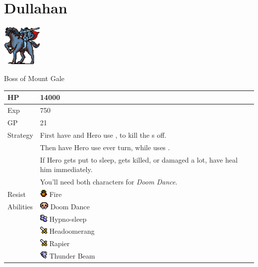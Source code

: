 \section{Dullahan}
\label{monster:dullahan}

\includegraphics[height=2cm,keepaspectratio]{./resources/monster/dullahan}

Boss of Mount Gale

\begin{longtable}{ l p{9cm} }
	HP
	& 14000
\\ \hline
	Exp
	& 750
\\ \hline
	GP
	& 21
\\ \hline
	Strategy
	& First have \nameref{char:kaeli} and Hero use \nameref{spell:aero}, to kill the \nameref{monster:vampire}s off. \\
	& Then have Hero use \nameref{spell:meteor} ever turn, while \nameref{char:kaeli} uses \nameref{spell:aero}. \\
	& If Hero gets put to sleep, gets killed, or damaged a lot, have \nameref{char:kaeli} heal him immediately. \\
	& You'll need both characters for \textit{Doom Dance}.
\\ \hline
	Resist
	& \includegraphics[height=1em,keepaspectratio]{./resources/effects/fire} Fire
\\ \hline
	Abilities
	& \includegraphics[height=1em,keepaspectratio]{./resources/effects/fatal} Doom Dance \\
	& \includegraphics[height=1em,keepaspectratio]{./resources/effects/sleep} Hypno-sleep \\
	& \includegraphics[height=1em,keepaspectratio]{./resources/effects/damage} Headoomerang \\
	& \includegraphics[height=1em,keepaspectratio]{./resources/effects/damage} Rapier \\
	& \includegraphics[height=1em,keepaspectratio]{./resources/effects/wind} Thunder Beam
\end{longtable}
